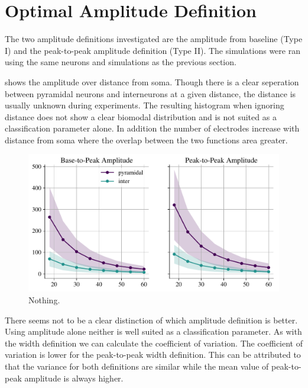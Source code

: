 \documentclass[altfont, fleqn]{uiophd}
\renewcommand{\Cref}[1]{{\color{viridis_03}\myCref{#1}}}
\begin{document}
\noindent
\newpage
\section{Optimal Amplitude Definition}
The two amplitude definitions investigated are
the amplitude from baseline (Type I) and 
the peak-to-peak amplitude definition (Type II).
The simulations were ran using the same neurons and simulations
as the previous section.

\Cref{fig:4_amp_distance} shows the amplitude over distance from soma. 
Though there is a clear seperation between pyramidal neurons and interneurons
at a given distance, the distance is usually unknown during experiments. 
The resulting histogram when ignoring distance does not show a clear
biomodal distribution and is not suited as a classification parameter alone. 
In addition the number of electrodes increase with distance from soma where
the overlap between the two functions area greater. 

\begin{figure}[h]
    \begin{center}
        \includegraphics[width=\textwidth]{images/sec_4/int_pyr_amps_dist.pdf}
        \caption{
            Nothing.
        }
        \label{fig:4_amp_distance}
    \end{center}
\end{figure}

There seems not to be a clear distinction of which amplitude definition is better. 
Using amplitude alone neither is well suited as a classification parameter. 
As with the width definition we can calculate the coefficient of variation. 
The coefficient of variation is lower for the peak-to-peak width definition. 
This can be attributed to that the variance for both definitions are similar 
while the mean value of peak-to-peak amplitude is always higher. 
\end{document}
